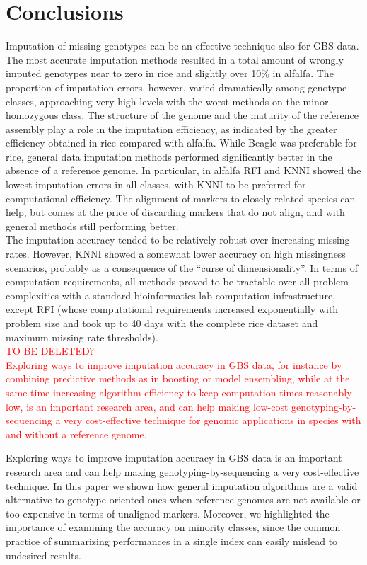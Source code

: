\section{Conclusions}
\label{sec:conclusions}
Imputation of missing genotypes can be an effective technique also for GBS data.
The most accurate imputation methods resulted in a total amount of wrongly imputed genotypes near to zero in rice and slightly over 10\% in alfalfa. 
The proportion of imputation errors, however, varied dramatically among genotype classes, approaching very high levels with the worst methods on the minor homozygous class.
The structure of the genome and the maturity of the reference assembly play a role in the imputation efficiency, as indicated by the greater efficiency obtained in rice compared with alfalfa. While Beagle was preferable for rice, general data imputation methods performed significantly better in the absence of a reference genome. In particular, in alfalfa RFI and KNNI showed the lowest imputation errors in all classes, with KNNI to be preferred for computational efficiency. The alignment of markers to closely related species can help, but comes at the price of discarding markers that do not align, and with general methods still performing better.\\
The imputation accuracy tended to be relatively robust over increasing missing rates. However, KNNI showed a somewhat lower accuracy on high missingness scenarios, probably as a consequence of the ``curse of dimensionality''. In terms of computation requirements, all methods proved to be tractable over all problem complexities with a standard bioinformatics-lab computation infrastructure, except RFI (whose computational requirements increased exponentially with problem size and took up to 40 days with the complete rice dataset and maximum missing rate thresholds).\\

\textcolor{red}{TO BE DELETED?\\Exploring ways to improve imputation accuracy in GBS data, for instance by combining predictive methods as in boosting or model ensembling, while at the same time increasing algorithm efficiency to keep computation times reasonably low, is an important research area, and can help making low-cost genotyping-by-sequencing a very cost-effective technique for genomic applications in species with and without a reference genome.}

Exploring ways to improve imputation accuracy in GBS data is an important research area and can help making genotyping-by-sequencing a very cost-effective technique. In this paper we shown how general imputation algorithms are a valid alternative to genotype-oriented ones when reference genomes are not available or too expensive in terms of unaligned markers. Moreover, we highlighted the importance of examining the accuracy on minority classes, since the common practice of summarizing performances in a single index can easily mislead to undesired results.




